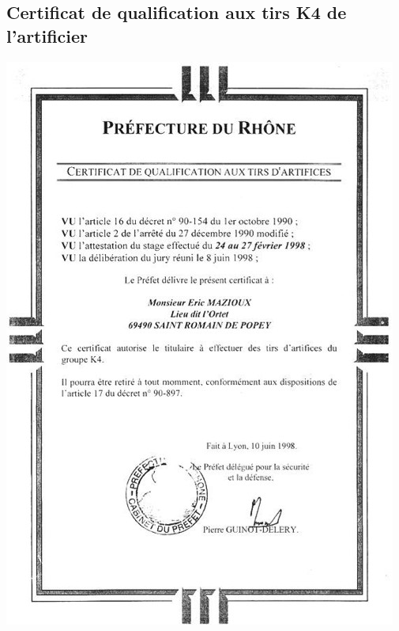\documentclass[hidelinks, paper=a4, fontsize=13pt]{report}
\begin{document}
\subsection{Certificat de qualification aux tirs K4 de l’artificier}
\begin{center}
\includegraphics[scale=0.75]{Annexes/Documents/CertificatArtifice}
\end{center}
\end{document}
